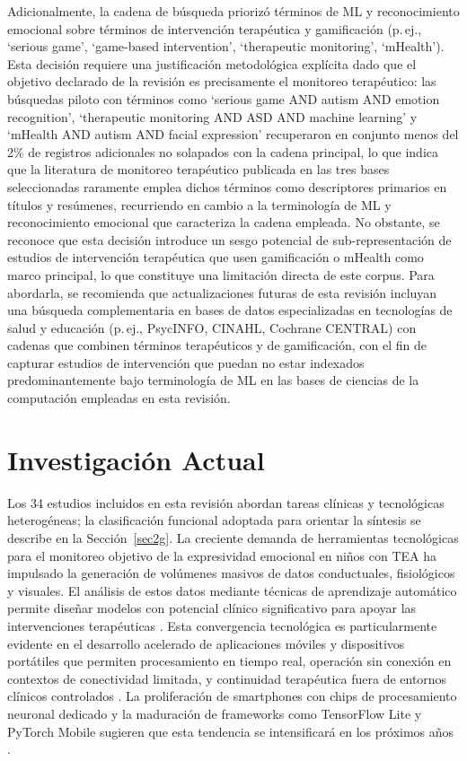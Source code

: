 \documentclass[ASNA,twocolumn]{USG}
\begin{document}
	Adicionalmente, la cadena de búsqueda priorizó términos de ML y reconocimiento
	emocional sobre términos de intervención terapéutica y gamificación (p.\,ej.,
	`serious game', `game-based intervention', `therapeutic monitoring', `mHealth').
	Esta decisión requiere una justificación metodológica explícita dado que el
	objetivo declarado de la revisión es precisamente el monitoreo terapéutico: las
	búsquedas piloto con términos como `serious game AND autism AND emotion
	recognition', `therapeutic monitoring AND ASD AND machine learning' y `mHealth
	AND autism AND facial expression' recuperaron en conjunto menos del 2\% de
	registros adicionales no solapados con la cadena principal, lo que indica que la
	literatura de monitoreo terapéutico publicada en las tres bases seleccionadas
	raramente emplea dichos términos como descriptores primarios en títulos y
	resúmenes, recurriendo en cambio a la terminología de ML y reconocimiento
	emocional que caracteriza la cadena empleada. No obstante, se reconoce que esta
	decisión introduce un sesgo potencial de sub-representación de estudios de
	intervención terapéutica que usen gamificación o mHealth como marco principal, lo
	que constituye una limitación directa de este corpus. Para abordarla, se
	recomienda que actualizaciones futuras de esta revisión incluyan una búsqueda
	complementaria en bases de datos especializadas en tecnologías de salud y
	educación (p.\,ej., PsycINFO, CINAHL, Cochrane CENTRAL) con cadenas que combinen
	términos terapéuticos y de gamificación, con el fin de capturar estudios de
	intervención que puedan no estar indexados predominantemente bajo terminología de
	ML en las bases de ciencias de la computación empleadas en esta revisión.
	
	\section{Investigación Actual}\label{sec3}
	
	Los 34 estudios incluidos en esta revisión abordan tareas clínicas y tecnológicas
	heterogéneas; la clasificación funcional adoptada para orientar la síntesis se
	describe en la Sección~\ref{sec2g}. La creciente demanda de herramientas
	tecnológicas para el monitoreo objetivo de la expresividad emocional en niños con
	TEA ha impulsado la generación de volúmenes masivos de datos conductuales,
	fisiológicos y visuales. El análisis de estos datos mediante técnicas de aprendizaje
	automático permite diseñar modelos con potencial clínico significativo para apoyar
	las intervenciones terapéuticas \cite{Johnson2025}. Esta convergencia tecnológica es
	particularmente evidente en el desarrollo acelerado de aplicaciones móviles y
	dispositivos portátiles que permiten procesamiento en tiempo real, operación sin
	conexión en contextos de conectividad limitada, y continuidad terapéutica fuera de
	entornos clínicos controlados \cite{Levy2024}. La proliferación de smartphones con chips de procesamiento neuronal dedicado y la maduración de frameworks como TensorFlow Lite y PyTorch Mobile sugieren que esta tendencia se intensificará en los próximos años \cite{Levy2024}.
	
\end{document}
